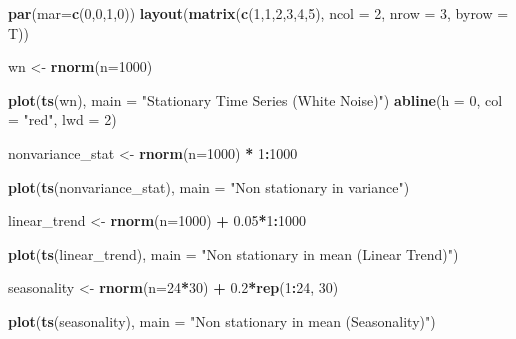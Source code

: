 \documentclass[
]{article}
\newenvironment{Shaded}{\begin{snugshade}}{\end{snugshade}}
\newcommand{\AttributeTok}[1]{\textcolor[rgb]{0.13,0.29,0.53}{#1}}
\newcommand{\DecValTok}[1]{\textcolor[rgb]{0.00,0.00,0.81}{#1}}
\newcommand{\FloatTok}[1]{\textcolor[rgb]{0.00,0.00,0.81}{#1}}
\newcommand{\FunctionTok}[1]{\textcolor[rgb]{0.13,0.29,0.53}{\textbf{#1}}}
\newcommand{\NormalTok}[1]{#1}
\newcommand{\OtherTok}[1]{\textcolor[rgb]{0.56,0.35,0.01}{#1}}
\newcommand{\SpecialCharTok}[1]{\textcolor[rgb]{0.81,0.36,0.00}{\textbf{#1}}}
\newcommand{\StringTok}[1]{\textcolor[rgb]{0.31,0.60,0.02}{#1}}
\begin{document}
\begin{Shaded}
\begin{Highlighting}[]
\FunctionTok{par}\NormalTok{(}\AttributeTok{mar=}\FunctionTok{c}\NormalTok{(}\DecValTok{0}\NormalTok{,}\DecValTok{0}\NormalTok{,}\DecValTok{1}\NormalTok{,}\DecValTok{0}\NormalTok{))}
\FunctionTok{layout}\NormalTok{(}\FunctionTok{matrix}\NormalTok{(}\FunctionTok{c}\NormalTok{(}\DecValTok{1}\NormalTok{,}\DecValTok{1}\NormalTok{,}\DecValTok{2}\NormalTok{,}\DecValTok{3}\NormalTok{,}\DecValTok{4}\NormalTok{,}\DecValTok{5}\NormalTok{), }\AttributeTok{ncol =} \DecValTok{2}\NormalTok{, }\AttributeTok{nrow =} \DecValTok{3}\NormalTok{, }\AttributeTok{byrow =}\NormalTok{ T))}

\NormalTok{wn }\OtherTok{\textless{}{-}} \FunctionTok{rnorm}\NormalTok{(}\AttributeTok{n=}\DecValTok{1000}\NormalTok{)}

\FunctionTok{plot}\NormalTok{(}\FunctionTok{ts}\NormalTok{(wn), }\AttributeTok{main =} \StringTok{"Stationary Time Series (White Noise)"}\NormalTok{)}
\FunctionTok{abline}\NormalTok{(}\AttributeTok{h =} \DecValTok{0}\NormalTok{, }\AttributeTok{col =} \StringTok{"red"}\NormalTok{, }\AttributeTok{lwd =} \DecValTok{2}\NormalTok{)}

\NormalTok{nonvariance\_stat }\OtherTok{\textless{}{-}} \FunctionTok{rnorm}\NormalTok{(}\AttributeTok{n=}\DecValTok{1000}\NormalTok{) }\SpecialCharTok{*} \DecValTok{1}\SpecialCharTok{:}\DecValTok{1000}

\FunctionTok{plot}\NormalTok{(}\FunctionTok{ts}\NormalTok{(nonvariance\_stat), }
     \AttributeTok{main =} \StringTok{"Non stationary in variance"}\NormalTok{)}

\NormalTok{linear\_trend }\OtherTok{\textless{}{-}} \FunctionTok{rnorm}\NormalTok{(}\AttributeTok{n=}\DecValTok{1000}\NormalTok{) }\SpecialCharTok{+} \FloatTok{0.05}\SpecialCharTok{*}\DecValTok{1}\SpecialCharTok{:}\DecValTok{1000}

\FunctionTok{plot}\NormalTok{(}\FunctionTok{ts}\NormalTok{(linear\_trend), }
     \AttributeTok{main =} \StringTok{"Non stationary in mean (Linear Trend)"}\NormalTok{)}

\NormalTok{seasonality }\OtherTok{\textless{}{-}} \FunctionTok{rnorm}\NormalTok{(}\AttributeTok{n=}\DecValTok{24}\SpecialCharTok{*}\DecValTok{30}\NormalTok{) }\SpecialCharTok{+} \FloatTok{0.2}\SpecialCharTok{*}\FunctionTok{rep}\NormalTok{(}\DecValTok{1}\SpecialCharTok{:}\DecValTok{24}\NormalTok{, }\DecValTok{30}\NormalTok{)}

\FunctionTok{plot}\NormalTok{(}\FunctionTok{ts}\NormalTok{(seasonality), }
     \AttributeTok{main =} \StringTok{"Non stationary in mean (Seasonality)"}\NormalTok{)}


\end{Highlighting}
\end{Shaded}
\end{document}
